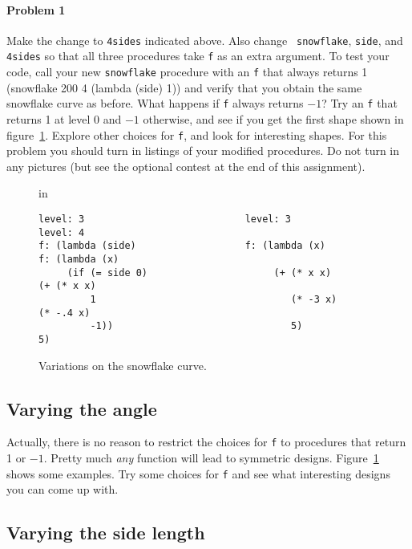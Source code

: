 \paragraph{Problem 1}
Make the change to {\tt 4sides} indicated above.  Also change {\tt
snowflake}, {\tt side}, and {\tt 4sides} so that all three procedures
take {\tt f} as an extra argument.  To test your code, call your new
{\tt snowflake} procedure with an {\tt f} that always returns 1
\beginlisp
(snowflake 200 4 (lambda (side) 1))
\endlisp
and verify that you obtain the same snowflake curve as before.  What
happens if {\tt f} always returns $-1$?  Try an {\tt f} that returns 1
at level 0 and $-1$ otherwise, and see if you get the first shape
shown in figure~\ref{snowflake-variants}.  Explore other choices for
{\tt f}, and look for interesting shapes.  For this problem you should
turn in listings of your modified procedures.  Do not turn in any
pictures (but see the optional contest at the end of this assignment).

\begin{figure}
 in
{\small
\begin{verbatim}
level: 3                            level: 3                        level: 4
f: (lambda (side)                   f: (lambda (x)                  f: (lambda (x)
     (if (= side 0)                      (+ (* x x)                      (+ (* x x)
         1                                  (* -3 x)                        (* -.4 x)
         -1))                               5)                              5)
\end{verbatim}
}
\caption{{\protect\footnotesize
Variations on the snowflake curve.}}
\label{snowflake-variants}
\end{figure}


\subsection{Varying the angle}

Actually, there is no reason to restrict the choices for {\tt f} to
procedures that return 1 or $-1$.  Pretty much {\em any} function will
lead to symmetric designs.  Figure~\ref{snowflake-variants} shows some
examples.  Try some choices for {\tt f} and see what interesting designs
you can come up with.


\subsection{Varying the side length}

